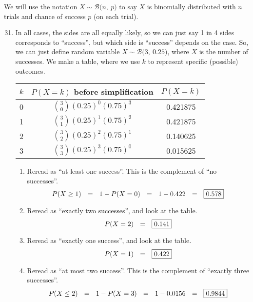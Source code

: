\documentclass[12pt,letterpaper]{article}
\begin{document}
\newcommand{\N}[2]{\mathcal{N}\big(#1,~#2\big)}
\newcommand{\Geo}[1]{\texttt{Geo}\big(#1\big)}
\newcommand{\B}[2]{\mathcal{B}\big(#1,~#2\big)}
\newcommand{\AND}{\textsc{~and~}}
\newcommand{\OR}{\textsc{~or~}}

We will use the notation $X\sim \B{n}{p}$ to say $X$ is binomially distributed with $n$ trials and chance of success $p$ (on each trial). 

\begin{enumerate}
\setcounter{enumi}{30}

\item In all cases, the sides are all equally likely, so we can just say 1 in 4 sides corresponds to ``success'', but which side is ``success'' depends on the case. So, we can just define random variable $X\sim\B{3}{0.25}$, where $X$ is the number of successes. We make a table, where we use $k$ to represent specific (possible) outcomes.
\begin{center}
\renewcommand{\arraystretch}{1.5}
\begin{tabular}{|c|c|c|}\hline
$k$ & $P(X=k)$ before simplification & $P(X=k)$ \\ \hline
0  & ${3\choose 0} (0.25)^{0} (0.75)^3$ &  0.421875 \\
1  & ${3\choose 1} (0.25)^{1} (0.75)^2$ & 0.421875 \\
2  & ${3\choose 2} (0.25)^{2} (0.75)^1$ &  0.140625 \\
3  & ${3\choose 3} (0.25)^{3} (0.75)^0$ &  0.015625 \\ \hline
\end{tabular}
\end{center}
\begin{enumerate}
\item Reread as ``at least one success''. This is the complement of ``no successes''.
$$P(X\ge 1) ~~=~~ 1-P(X=0) ~~=~~ 1-0.422 ~~=~~ \fbox{0.578}$$
\item Reread as ``exactly two successes'', and look at the table.
$$P(X = 2) ~~=~~ \fbox{0.141}$$
\item Reread as ``exactly one success'', and look at the table.
$$P(X = 1) ~~=~~ \fbox{0.422}$$
\item Reread as ``at most two success''. This is the complement of ``exactly three successes''.
$$P(X \le 2) ~~=~~ 1 - P(X=3) ~~=~~ 1-0.0156 ~~=~~ \fbox{0.9844} $$

\end{enumerate}

\newpage


\end{enumerate}
\end{document}
